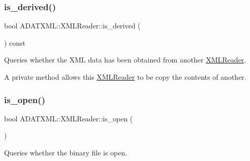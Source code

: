 \subsubsection{\texorpdfstring{is\_derived()}{is\_derived()}\hspace{0.1cm}{\footnotesize\ttfamily [3/3]}}
{\footnotesize\ttfamily bool A\+D\+A\+T\+X\+M\+L\+::\+X\+M\+L\+Reader\+::is\+\_\+derived (\begin{DoxyParamCaption}{ }\end{DoxyParamCaption}) const}



Queries whether the X\+ML data has been obtained from another \mbox{\hyperlink{classADATXML_1_1XMLReader}{X\+M\+L\+Reader}}. 

A private method allows this \mbox{\hyperlink{classADATXML_1_1XMLReader}{X\+M\+L\+Reader}} to be copy the contents of another. \mbox{\label{classADATXML_1_1XMLReader_ae9e467fca3d4bf34351dc00e9797a06f}} 
\subsubsection{\texorpdfstring{is\_open()}{is\_open()}\hspace{0.1cm}{\footnotesize\ttfamily [1/3]}}
{\footnotesize\ttfamily bool A\+D\+A\+T\+X\+M\+L\+::\+X\+M\+L\+Reader\+::is\+\_\+open (\begin{DoxyParamCaption}{ }\end{DoxyParamCaption})\hspace{0.3cm}{\ttfamily [inline]}}



Queries whether the binary file is open. 

